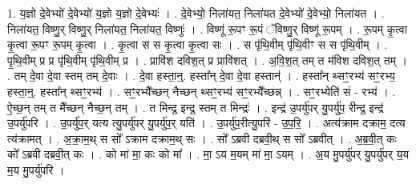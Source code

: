 \documentclass[17pt]{extarticle}
\begin{document}
1. य॒ज्ञो दे॒वेभ्यो॑ दे॒वेभ्यो॑ य॒ज्ञो य॒ज्ञो दे॒वेभ्यः॑ । . दे॒वेभ्यो॒ निला॑यत॒ निला॑यत दे॒वेभ्यो॑ दे॒वेभ्यो॒ निला॑यत । . निला॑यत॒ विष्णु॒र् विष्णु॒र् निला॑यत॒ निला॑यत॒ विष्णुः॑ । . विष्णू॑ रू॒पꣳ रू॒पं ॅविष्णु॒र् विष्णू॑ रू॒पम् । . रू॒पम् कृ॒त्वा कृ॒त्वा रू॒पꣳ रू॒पम् कृ॒त्वा । . कृ॒त्वा स स कृ॒त्वा कृ॒त्वा सः । . स पृ॑थि॒वीम् पृ॑थि॒वीꣳ स स पृ॑थि॒वीम् । . पृ॒थि॒वीम् प्र प्र पृ॑थि॒वीम् पृ॑थि॒वीम् प्र । . प्रावि॑श दविश॒त् प्र प्रावि॑शत् । . अ॒वि॒श॒त् तम् त म॑विश दविश॒त् तम् । . तम् दे॒वा दे॒वा स्तम् तम् दे॒वाः । . दे॒वा हस्ता॒न्॒. हस्ता᳚न् दे॒वा दे॒वा हस्तान्॑ । . हस्ता᳚न् थ्सꣳ॒॒रभ्य॑ सꣳ॒॒रभ्य॒ हस्ता॒न्॒. हस्ता᳚न् थ्सꣳ॒॒रभ्य॑ । . सꣳ॒॒रभ्यै᳚च्छन् नैच्छन् थ्सꣳ॒॒रभ्य॑ सꣳ॒॒रभ्यै᳚च्छन्न् । . सꣳ॒॒रभ्येति॑ सं - रभ्य॑ । . ऐ॒च्छ॒न् तम् त मै᳚च्छन् नैच्छ॒न् तम् । . त मिन्द्र॒ इन्द्र॒ स्तम् त मिन्द्रः॑ । . इन्द्र॑ उ॒पर्यु॑पर् यु॒पर्यु॑प॒ रीन्द्र॒ इन्द्र॑ उ॒पर्यु॑परि । . उ॒पर्यु॑प॒र् यत्य त्यु॒पर्यु॑पर् यु॒पर्यु॑प॒र् यति॑ । . उ॒पर्यु॑प॒रीत्यु॒परि॑ - उ॒प॒रि॒ । . अत्य॑क्राम दक्राम॒ दत्य त्य॑क्रामत् । . अ॒क्रा॒म॒थ् स सो᳚ ऽक्राम दक्राम॒थ् सः । . सो᳚ ऽब्रवी दब्रवी॒थ् स सो᳚ ऽब्रवीत् । . अ॒ब्र॒वी॒त् कः को᳚ ऽब्रवी दब्रवी॒त् कः । . को मा॑ मा॒ कः को मा᳚ । . मा॒ ऽय म॒यम् मा॑ मा॒ ऽयम् । . अ॒य मु॒पर्यु॑पर् यु॒पर्यु॑पर् य॒य म॒य मु॒पर्यु॑परि । \newline
\end{document}
